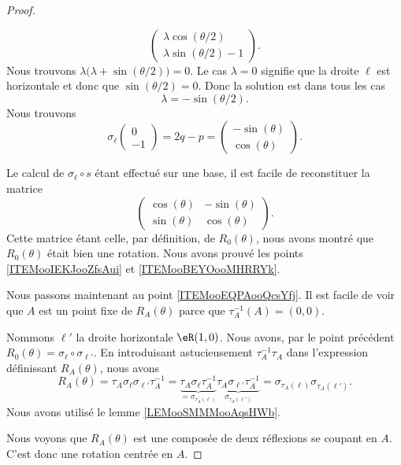 \begin{proof}
\begin{subproof}
\begin{equation}
\begin{pmatrix}
				\lambda\cos(\theta/2) \\
				\lambda\sin(\theta/2)-1
			\end{pmatrix}.
		\end{equation}
		Nous trouvons \( \lambda\big( \lambda+\sin(\theta/2) \big)=0\). Le cas \( \lambda=0\) signifie que la droite \( \ell\) est horizontale et donc que \( \sin(\theta/2)=0\). Donc la solution est dans tous les cas
		\begin{equation}
			\lambda=-\sin(\theta/2).
		\end{equation}
		Nous trouvons
		\begin{equation}
			\sigma_{\ell}\begin{pmatrix}
				0 \\
				-1
			\end{pmatrix}=2q-p=\begin{pmatrix}
				-\sin(\theta) \\
				\cos(\theta)
			\end{pmatrix}.
		\end{equation}
	\end{subproof}
	Le calcul de \( \sigma_{\ell}\circ s\) étant effectué sur une base, il est facile de reconstituer la matrice
	\begin{equation}
		\begin{pmatrix}
			\cos(\theta) & -\sin(\theta) \\
			\sin(\theta) & \cos(\theta)
		\end{pmatrix}.
	\end{equation}
	Cette matrice étant celle, par définition, de \( R_0(\theta)\), nous avons montré que \( R_0(\theta)\) était bien une rotation. Nous avons prouvé les points \ref{ITEMooIEKJooZfsAui} et \ref{ITEMooBEYOooMHRRYk}.

	Nous passons maintenant au point \ref{ITEMooEQPAooQcsYfj}. Il est facile de voir que \( A\) est un point fixe de \( R_{A}(\theta)\) parce que \( \tau_A^{-1}(A)=(0,0)\).

	Nommons \( \ell'\) la droite horizontale \( \eR(1,0)\). Nous avons, par le point précédent \( R_0(\theta)=\sigma_{\ell}\circ \sigma_{\ell'}\). En introduisant astucieusement \( \tau_A^{-1}\tau_A\) dans l'expression définissant \( R_A(\theta)\), nous avons
	\begin{equation}
		R_A(\theta)=\tau_A\sigma_{\ell}\sigma_{\ell'}\tau_A^{-1}=\underbrace{\tau_A\sigma_{\ell}\tau_A^{-1}}_{=\sigma_{\tau_A(\ell)}}\underbrace{\tau_A\sigma_{\ell'}\tau_A^{-1}}_{\sigma_{\tau_A(\ell')}}=\sigma_{\tau_A(\ell)}\sigma_{\tau_A(\ell')}.
	\end{equation}
	Nous avons utilisé le lemme \ref{LEMooSMMMooAqsHWb}.

	Nous voyons que \( R_A(\theta)\) est une composée de deux réflexions se coupant en \( A\). C'est donc une rotation centrée en \( A\).
\end{proof}



